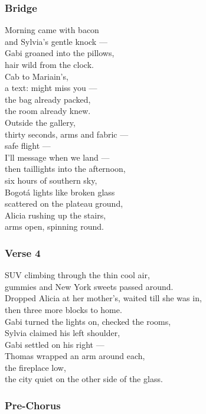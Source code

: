 \documentclass[]{article}
\begin{document}
\subsubsection{Bridge}\label{bridge-18}

Morning came with bacon\\
and Sylvia's gentle knock ---\\
Gabi groaned into the pillows,\\
hair wild from the clock.\\
Cab to Mariain's,\\
a text: might miss you ---\\
the bag already packed,\\
the room already knew.\\
Outside the gallery,\\
thirty seconds, arms and fabric ---\\
safe flight ---\\
I'll message when we land ---\\
then taillights into the afternoon,\\
six hours of southern sky,\\
Bogotá lights like broken glass\\
scattered on the plateau ground,\\
Alicia rushing up the stairs,\\
arms open, spinning round.

\subsubsection{Verse 4}\label{verse-4-9}

SUV climbing through the thin cool air,\\
gummies and New York sweets passed around.\\
Dropped Alicia at her mother's, waited till she was in,\\
then three more blocks to home.\\
Gabi turned the lights on, checked the rooms,\\
Sylvia claimed his left shoulder,\\
Gabi settled on his right ---\\
Thomas wrapped an arm around each,\\
the fireplace low,\\
the city quiet on the other side of the glass.

\subsubsection{Pre-Chorus}\label{pre-chorus-43}
\end{document}
